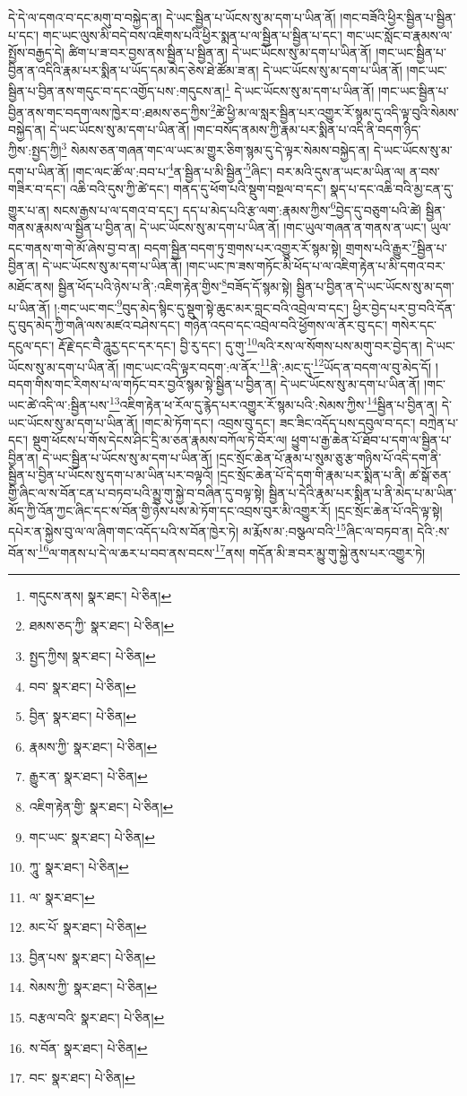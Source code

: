 དེ་དེ་ལ་དགའ་བ་དང་མགུ་བ་བསྐྱེད་ན། དེ་ཡང་སྦྱིན་པ་ཡོངས་སུ་མ་དག་པ་ཡིན་ནོ། །གང་བཟོའི་ཕྱིར་སྦྱིན་པ་སྦྱིན་པ་དང་། གང་ཡང་ལུས་མི་བདེ་བས་འཇིགས་པའི་ཕྱིར་སྨན་པ་ལ་སྦྱིན་པ་སྦྱིན་པ་དང་། གང་ཡང་སློང་བ་རྣམས་ལ་སྤྱོས་བརྒྱད་དེ། ཚིག་པ་ཟ་བར་བྱས་ནས་སྦྱིན་པ་སྦྱིན་ན། དེ་ཡང་ཡོངས་སུ་མ་དག་པ་ཡིན་ནོ། །གང་ཡང་སྦྱིན་པ་བྱིན་ན་འདིའི་རྣམ་པར་སྨིན་པ་ཡོད་དམ་མེད་ཅེས་ཐེ་ཚོམ་ཟ་ན། དེ་ཡང་ཡོངས་སུ་མ་དག་པ་ཡིན་ནོ། །གང་ཡང་སྦྱིན་པ་བྱིན་ནས་གདུང་བ་དང་འགྱོད་པས་:གདུངས་ན།\footnote{གདུངས་ནས།  སྣར་ཐང་།  པེ་ཅིན། } དེ་ཡང་ཡོངས་སུ་མ་དག་པ་ཡིན་ནོ། །གང་ཡང་སྦྱིན་པ་བྱིན་ནས་གང་བདག་ལས་ཁྱེར་བ་:ཐམས་ཅད་ཀྱིས་\footnote{ཐམས་ཅད་ཀྱི་  སྣར་ཐང་།  པེ་ཅིན། }ཚེ་ཕྱི་མ་ལ་སླར་སྦྱིན་པར་འགྱུར་རོ་སྙམ་དུ་འདི་ལྟ་བུའི་སེམས་བསྐྱེད་ན། དེ་ཡང་ཡོངས་སུ་མ་དག་པ་ཡིན་ནོ། །གང་བསོད་ནམས་ཀྱི་རྣམ་པར་སྨིན་པ་འདི་ནི་བདག་ཉིད་ཀྱིས་:སྤྱད་ཀྱི།\footnote{སྤྱད་ཀྱིས།  སྣར་ཐང་།  པེ་ཅིན། } སེམས་ཅན་གཞན་གང་ལ་ཡང་མ་གྱུར་ཅིག་སྙམ་དུ་དེ་ལྟར་སེམས་བསྐྱེད་ན། དེ་ཡང་ཡོངས་སུ་མ་དག་པ་ཡིན་ནོ། །གང་ལང་ཚོ་ལ་:བབ་པ་\footnote{བབ་  སྣར་ཐང་།  པེ་ཅིན། }ན་སྦྱིན་པ་མི་སྦྱིན་\footnote{བྱིན་  སྣར་ཐང་།  པེ་ཅིན། }ཞིང་། བར་མའི་དུས་ན་ཡང་མ་ཡིན་ལ། ན་བས་གཟིར་བ་དང་། འཆི་བའི་དུས་ཀྱི་ཚེ་དང་། གནད་དུ་ཕོག་པའི་སྡུག་བསྔལ་བ་དང་། སྣད་པ་དང་འཆི་བའི་མྱ་ངན་དུ་གྱུར་པ་ན། སངས་རྒྱས་པ་ལ་དགའ་བ་དང་། དད་པ་མེད་པའི་རྩ་ལག་:རྣམས་ཀྱིས་\footnote{རྣམས་ཀྱི་  སྣར་ཐང་།  པེ་ཅིན། }བྱེད་དུ་བཅུག་པའི་ཚེ། སྦྱིན་གནས་རྣམས་ལ་སྦྱིན་པ་བྱིན་ན། དེ་ཡང་ཡོངས་སུ་མ་དག་པ་ཡིན་ནོ། །གང་ཡུལ་གཞན་ན་གནས་ན་ཡང་། ཡུལ་དང་གནས་ག་གེ་མོ་ཞེས་བྱ་བ་ན། བདག་སྦྱིན་བདག་ཏུ་གྲགས་པར་འགྱུར་རོ་སྙམ་སྟེ། གྲགས་པའི་རྒྱུར་\footnote{རྒྱུར་ན་  སྣར་ཐང་།  པེ་ཅིན། }སྦྱིན་པ་བྱིན་ན། དེ་ཡང་ཡོངས་སུ་མ་དག་པ་ཡིན་ནོ། །གང་ཡང་ཁ་ཟས་གཏོང་མི་ཕོད་པ་ལ་འཇིག་རྟེན་པ་མི་དགའ་བར་མཐོང་ནས། སྦྱིན་ཕོད་པའི་ཉེས་པ་ནི་:འཇིག་རྟེན་གྱིས་\footnote{འཇིག་རྟེན་གྱི་  སྣར་ཐང་།  པེ་ཅིན། }བཟོད་དོ་སྙམ་སྟེ། སྦྱིན་པ་བྱིན་ན་དེ་ཡང་ཡོངས་སུ་མ་དག་པ་ཡིན་ནོ། །:གང་ཡང་གང་\footnote{གང་ཡང་  སྣར་ཐང་།  པེ་ཅིན། }བུད་མེད་སྙིང་དུ་སྡུག་སྟེ་ཆུང་མར་བླང་བའི་འབྲེལ་བ་དང་། ཕྱིར་བྱེད་པར་བྱ་བའི་དོན་དུ་བུད་མེད་ཀྱི་གཞི་ལས་མཛའ་བཤེས་དང་། གཉེན་འདབ་དང་འབྲེལ་བའི་ཕྱོགས་ལ་ནོར་བུ་དང་། གསེར་དང་དངུལ་དང་། རྡོ་རྗེ་དང་བཻ་ཌཱུརྱ་དང་དར་དང་། བྱི་རུ་དང་། དུ་གུ་\footnote{ཀཱུ་  སྣར་ཐང་།  པེ་ཅིན། }ལའི་རས་ལ་སོགས་པས་མགུ་བར་བྱེད་ན། དེ་ཡང་ཡོངས་སུ་མ་དག་པ་ཡིན་ནོ། །གང་ཡང་འདི་ལྟར་བདག་:ལ་ནོར་\footnote{ལ་  སྣར་ཐང་། }ནི་:མང་དུ་\footnote{མང་པོ་  སྣར་ཐང་།  པེ་ཅིན། }ཡོད་ན་བདག་ལ་བུ་མེད་དོ། །བདག་གིས་གང་རིགས་པ་ལ་གཏོང་བར་བྱའོ་སྙམ་སྟེ་སྦྱིན་པ་བྱིན་ན། དེ་ཡང་ཡོངས་སུ་མ་དག་པ་ཡིན་ནོ། །གང་ཡང་ཚེ་འདི་ལ་:སྦྱིན་པས་\footnote{བྱིན་པས་  སྣར་ཐང་།  པེ་ཅིན། }འཇིག་རྟེན་ཕ་རོལ་དུ་རྙེད་པར་འགྱུར་རོ་སྙམ་པའི་:སེམས་ཀྱིས་\footnote{སེམས་ཀྱི་  སྣར་ཐང་།  པེ་ཅིན། }སྦྱིན་པ་བྱིན་ན། དེ་ཡང་ཡོངས་སུ་མ་དག་པ་ཡིན་ནོ། །གང་མེ་ཏོག་དང་། འབྲས་བུ་དང་། ཟང་ཟིང་འདོད་པས་དབུལ་བ་དང་། བཀྲེན་པ་དང་། སྡུག་ཕོངས་པ་གོས་དེངས་ཤིང་དྲི་མ་ཅན་རྣམས་བཀོལ་ཏེ་བོར་ལ། ཕྱུག་པ་རྒྱ་ཆེན་པོ་ཐོབ་པ་དག་ལ་སྦྱིན་པ་བྱིན་ན། དེ་ཡང་སྦྱིན་པ་ཡོངས་སུ་མ་དག་པ་ཡིན་ནོ། །དྲང་སྲོང་ཆེན་པོ་རྣམ་པ་སུམ་ཅུ་རྩ་གཉིས་པོ་འདི་དག་ནི་སྦྱིན་པ་བྱིན་པ་ཡོངས་སུ་དག་པ་མ་ཡིན་པར་བལྟའོ། །དྲང་སྲོང་ཆེན་པོ་དེ་དག་གི་རྣམ་པར་སྨིན་པ་ནི། ཚ་སྒོ་ཅན་གྱི་ཞིང་ལ་ས་བོན་ངན་པ་བཏབ་པའི་མྱུ་གུ་སྐྱེ་བ་བཞིན་དུ་བལྟ་སྟེ། སྦྱིན་པ་དེའི་རྣམ་པར་སྨིན་པ་ནི་མེད་པ་མ་ཡིན་མོད་ཀྱི་འོན་ཀྱང་ཞིང་དང་ས་བོན་གྱི་ཉེས་པས་མེ་ཏོག་དང་འབྲས་བུར་མི་འགྱུར་རོ། །དྲང་སྲོང་ཆེན་པོ་འདི་ལྟ་སྟེ། དཔེར་ན་སྐྱེས་བུ་ལ་ལ་ཞིག་གང་འདོད་པའི་ས་བོན་ཁྱེར་ཏེ། མ་རྨོས་མ་:བསྩལ་བའི་\footnote{བརྩལ་བའི་  སྣར་ཐང་།  པེ་ཅིན། }ཞིང་ལ་བཏབ་ན། དེའི་:ས་བོན་ས་\footnote{ས་བོན་  སྣར་ཐང་།  པེ་ཅིན། }ལ་གནས་པ་དེ་ལ་ཆར་པ་བབ་ནས་བངས་\footnote{བང་  སྣར་ཐང་།  པེ་ཅིན། }ནས། གདོན་མི་ཟ་བར་མྱུ་གུ་སྐྱེ་ནུས་པར་འགྱུར་ཏེ། 